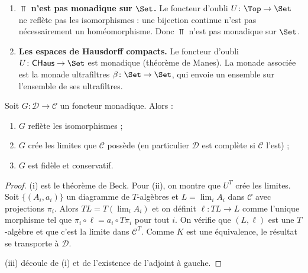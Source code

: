 \begin{exemple}\label{ex:non-monadique}
\begin{enumerate}[label=(\roman*)]
\item \textbf{$\Top$ n'est pas monadique sur $\Set$.}
    Le foncteur d'oubli $U \colon \Top \to \Set$ ne reflète pas
    les isomorphismes : une bijection continue n'est pas nécessairement
    un homéomorphisme. Donc $\Top$ n'est pas monadique sur $\Set$.

\item \textbf{Les espaces de Hausdorff compacts.}
    Le foncteur d'oubli $U \colon \mathsf{CHaus} \to \Set$
    est monadique (théorème de Manes).
    La monade associée est la monade ultrafiltres
    $\beta \colon \Set \to \Set$,
    qui envoie un ensemble sur l'ensemble de ses ultrafiltres.
\end{enumerate}
\end{exemple}

\begin{proposition}\label{prop:monadique-proprietes}
Soit $G \colon \mathcal{D} \to \mathcal{C}$ un foncteur monadique.
Alors :
\begin{enumerate}[label=(\roman*)]
\item $G$ reflète les isomorphismes ;
\item $G$ crée les limites que $\mathcal{C}$ possède
    (en particulier $\mathcal{D}$ est complète si $\mathcal{C}$ l'est) ;
\item $G$ est fidèle et conservatif.
\end{enumerate}
\end{proposition}

\begin{proof}
(i) est le théorème de Beck. Pour (ii), on montre que $U^T$ crée
les limites. Soit $\{(A_i, a_i)\}$ un diagramme de $T$-algèbres et
$L = \lim_i A_i$ dans $\mathcal{C}$ avec projections $\pi_i$.
Alors $TL = T(\lim_i A_i)$ et on définit $\ell \colon TL \to L$
comme l'unique morphisme tel que $\pi_i \circ \ell = a_i \circ T\pi_i$
pour tout $i$. On vérifie que $(L, \ell)$ est une $T$-algèbre et
que c'est la limite dans $\mathcal{C}^T$. Comme $K$ est une équivalence,
le résultat se transporte à $\mathcal{D}$.

(iii) découle de (i) et de l'existence de l'adjoint à gauche.
\end{proof}

